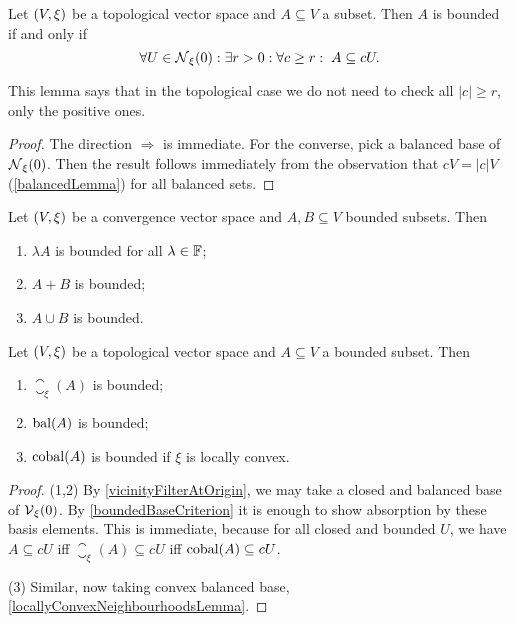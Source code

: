 \begin{lemma} \label{topologicalBoundedness}
Let $\left( V,\xi \right)$ be a topological vector space and $A\subseteq V$ a subset. Then $A$ is bounded \textup{if and only if}
\[ \forall U\in \operatorname{\mathcal{N}}_{\xi}(0): \exists r > 0: \forall c \geq r: \; A \subseteq cU. \]
\end{lemma}
This lemma says that in the topological case we do not need to check all $|c| \geq r$, only the positive ones.
\begin{proof}
The direction $\Rightarrow$ is immediate. For the converse, pick a balanced base of $\operatorname{\mathcal{N}}_{\xi}(0)$. Then the result follows immediately from the observation that $cV = |c|V$ (\ref{balancedLemma}) for all balanced sets.
\end{proof}

\begin{lemma} \label{boundedSetLemma}
Let $\left( V,\xi \right)$ be a convergence vector space and $A,B\subseteq V$ bounded subsets. Then
\begin{enumerate}
\item $\lambda A$ is bounded for all $\lambda\in\mathbb{F}$;
\item $A+B$ is bounded;
\item $A\cup B$ is bounded.
\end{enumerate}
\end{lemma}

\begin{lemma} \label{boundedSetsTVS}
Let $\left( V,\xi \right)$ be a topological vector space and $A\subseteq V$ a bounded subset. Then
\begin{enumerate}
\item $\closure_\xi(A)$ is bounded;
\item $\operatorname{bal}(A)$ is bounded;
\item $\operatorname{cobal}(A)$ is bounded if $\xi$ is locally convex.
\end{enumerate}
\end{lemma}
\begin{proof}
(1,2) By \ref{vicinityFilterAtOrigin}, we may take a closed and balanced base of $\operatorname{\mathcal{V}}_{\xi}(0)$. 
By \ref{boundedBaseCriterion} it is enough to show absorption by these basis elements. This is immediate, because for all closed and bounded $U$, we have $A\subseteq cU$ iff $\closure_\xi(A) \subseteq cU$ iff $\operatorname{cobal}(A) \subseteq cU$.

(3) Similar, now taking convex balanced base, \ref{locallyConvexNeighbourhoodsLemma}.
\end{proof}

